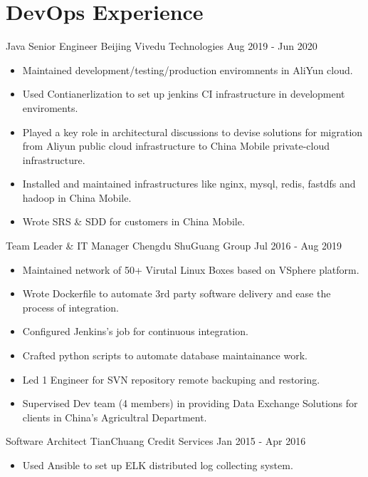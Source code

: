 \documentclass{resume}
\begin{document}
\section{DevOps Experience}
Java Senior Engineer\newline
Beijing Vivedu Technologies\newline
Aug 2019 - Jun 2020
\begin{itemize}
  \item Maintained development/testing/production enviromnents in AliYun cloud.
  \item Used Contianerlization to set up jenkins CI infrastructure in development enviroments.
  \item Played a key role in architectural discussions to devise solutions for migration from Aliyun public cloud infrastructure to China Mobile private-cloud infrastructure.
  \item Installed and maintained infrastructures like nginx, mysql, redis, fastdfs and hadoop in China Mobile.
  \item Wrote SRS \& SDD for customers in China Mobile.
\end{itemize}

\vspace{3mm}
Team Leader \& IT Manager\newline
Chengdu ShuGuang Group\newline
Jul 2016 - Aug 2019
\begin{itemize}
  \item Maintained network of 50+ Virutal Linux Boxes based on VSphere platform.
  \item Wrote Dockerfile to automate 3rd party software delivery and ease the process of integration.
  \item Configured Jenkins's job for continuous integration.
  \item Crafted python scripts to automate database maintainance work.
  \item Led 1 Engineer for SVN repository remote backuping and restoring.
  \item Supervised Dev team (4 members) in providing Data Exchange Solutions for clients in China's Agricultral Department.
\end{itemize}

\vspace{3mm}
Software Architect\newline
TianChuang Credit Services\newline
Jan 2015 - Apr 2016
\begin{itemize}
  \item Used Ansible to set up ELK distributed log collecting system.
\end{itemize}
\end{document}
